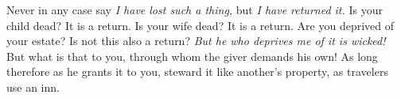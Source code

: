 Never  in any  case say  \emph{I  have lost  such  a thing,}  but \emph{I  have
returned it.} Is  your child dead? It is  a return. Is your wife dead?  It is a
return. Are you deprived  of your estate? Is not this  also a return? \emph{But
he who deprives me of it is wicked!}  But what is that to you, through whom the
giver demands  his own! As long  therefore as he  grants it to you,  steward it
like another's property, as travelers use an inn.
